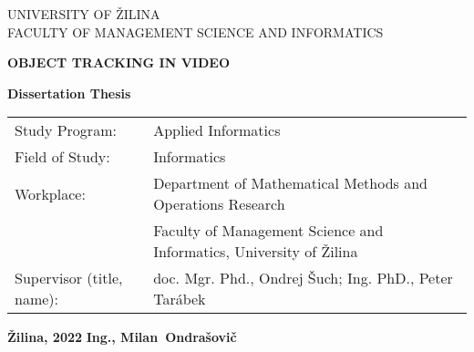 \begin{titlepage}
    \begin{center}
        \vspace*{1cm} %
        
        \LARGE
        UNIVERSITY OF ŽILINA\\
        \Large
        FACULTY OF MANAGEMENT SCIENCE AND INFORMATICS\\
        
        \vspace{6cm}
        
        \LARGE
        \textbf{OBJECT TRACKING IN VIDEO}
        
        \vspace{1cm}
        
        \textbf{Dissertation Thesis}
    \end{center}
    
    \vspace{2cm}
    
    \vfill
    
    \normalsize
    
    \begin{tabular}{ll}
        Study Program: & Applied Informatics\\
        Field of Study: & Informatics \\
        Workplace: & Department of Mathematical Methods and Operations Research\\
                  & Faculty of Management Science and Informatics, University of \v{Z}ilina\\
        Supervisor (title, name): & doc. Mgr. Phd., Ondrej \v{S}uch; Ing. PhD., Peter Tar\'{a}bek\\
    \end{tabular}
    
    \vspace{2cm}
    
    \textbf{\v{Z}ilina, 2022} \hfill \textbf{Ing., Milan~Ondra\v{s}ovi\v{c}}
    
\end{titlepage}

